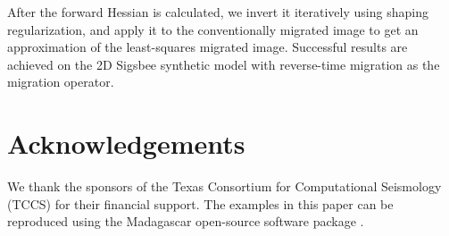     After the forward Hessian is calculated, we invert it iteratively using shaping regularization, and apply it to the conventionally migrated image to get an approximation of the least-squares migrated image.
    Successful results are achieved on the 2D Sigsbee synthetic model with reverse-time migration as the migration operator.


\section{Acknowledgements}
    We thank the sponsors of the Texas Consortium for Computational Seismology (TCCS) for their financial support.
    The examples in this paper can be reproduced using the Madagascar open-source software package \cite[]{madagascar}.

